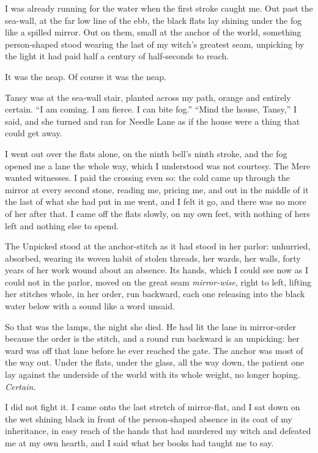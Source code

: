 I was already running for the water when the first stroke caught me. Out past the sea-wall, at the far low line of the ebb, the black flats lay shining under the fog like a spilled mirror. Out on them, small at the anchor of the world, something person-shaped stood wearing the last of my witch's greatest seam, unpicking by the light it had paid half a century of half-seconds to reach.

It was the neap. Of course it was the neap.

\scenebreak

Tansy was at the sea-wall stair, planted across my path, orange and entirely certain. ``I am coming. I am fierce. I can bite fog.'' ``Mind the house, Tansy,'' I said, and she turned and ran for Needle Lane as if the house were a thing that could get away.

I went out over the flats alone, on the ninth bell's ninth stroke, and the fog opened me a lane the whole way, which I understood was not courtesy. The Mere wanted witnesses. I paid the crossing even so: the cold came up through the mirror at every second stone, reading me, pricing me, and out in the middle of it the last of what she had put in me went, and I felt it go, and there was no more of her after that. I came off the flats slowly, on my own feet, with nothing of hers left and nothing else to spend.

The Unpicked stood at the anchor-stitch as it had stood in her parlor: unhurried, absorbed, wearing its woven habit of stolen threads, her wards, her walls, forty years of her work wound about an absence. Its hands, which I could see now as I could not in the parlor, moved on the great seam \emph{mirror-wise}, right to left, lifting her stitches whole, in her order, run backward, each one releasing into the black water below with a sound like a word unsaid.

So that was the lamps, the night she died. He had lit the lane in mirror-order because the order is the stitch, and a round run backward is an unpicking: her ward was off that lane before he ever reached the gate. The anchor was most of the way out. Under the flats, under the glass, all the way down, the patient one lay against the underside of the world with its whole weight, no longer hoping. \emph{Certain.}

I did not fight it. I came onto the last stretch of mirror-flat, and I sat down on the wet shining black in front of the person-shaped absence in its coat of my inheritance, in easy reach of the hands that had murdered my witch and defeated me at my own hearth, and I said what her books had taught me to say.

